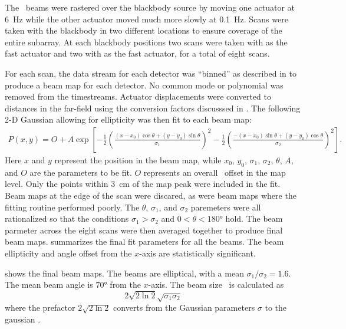 The \Imager\ beams were rastered over the blackbody source by moving one actuator at \SI{6}{\hertz} while the other actuator moved much more slowly at \SI{0.1}{\hertz}.
Scans were taken with the blackbody in two different locations to ensure coverage of the entire subarray.
At each blackbody positions two scans were taken with  as the fast actuator and two with  as the fast actuator, for a total of eight scans.

For each scan, the data stream for each detector was ``binned'' as described in  to produce a beam map for each detector.
No common mode or polynomial was removed from the timestreams.
Actuator displacements were converted to distances in the far-field using the conversion factors discusssed in .
The following 2-D Gaussian allowing for ellipticity was then fit to each beam map:
\begin{multline}
  P(x,y) = O + A \exp{ \left[  - \frac{1}{2} \left( \frac{ (x-x_0) \cos{\theta} + (y-y_0) \sin{\theta}}{\sigma_1} \right)^2 
                               - \frac{1}{2} \left( \frac{-(x-x_0) \sin{\theta} + (y-y_0) \cos{\theta}}{\sigma_2} \right)^2
                       \right] }.
\end{multline}
Here $x$ and $y$ represent the position in the beam map, while $x_0$, $y_0$, $\sigma_1$, $\sigma_2$, $\theta$, $A$, and $O$ are the parameters to be fit.
$O$ represents an overall \DC\ offset in the map level.
Only the points within \SI{3}{\cm} of the map peak were included in the fit.
Beam maps at the edge of the scan were discared, as were beam maps where the fitting routine performed poorly.
The $\theta$, $\sigma_1$, and $\sigma_2$ paremeters were all rationalized so that the conditions $\sigma_1 > \sigma_2$ and $0 < \theta < \ang{180}$ hold.
The beam parmeter across the eight scans were then averaged together to produce final beam maps.
 summarizes the final fit parameters for all the beams.
The beam ellipticity and angle offset from the $x$-axis are statistically significant.

 shows the final beam maps.
The beams are elliptical, with a mean $\sigma_1 / \sigma_2 = \si{1.6}$.
The mean beam angle is $\ang{70}$ from the $x$-axis.
The beam size \FWHM\ is calculated as
\begin{equation}
  2 \sqrt{2 \ln{2}} \sqrt{\sigma_1 \sigma_2}
\end{equation}
where the prefactor $2 \sqrt{2 \ln{2}}$ converts from the Gaussian parameters $\sigma$ to the gaussian \FWHM.

